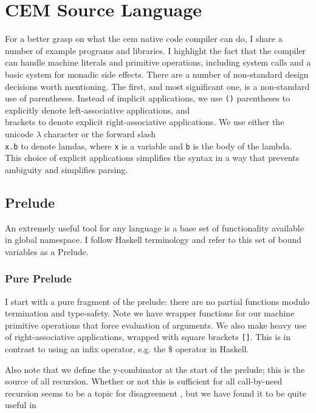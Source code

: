 \chapter{CEM Source Language}

For a better grasp on what the cem native code compiler can do, I share a
number of example programs and libraries. I highlight the fact that the compiler
can handle machine literals and primitive operations, including system calls and
a basic system for monadic side effects.  There are a number of non-standard
design decisions worth mentioning. The first, and most significant one, is a
non-standard use of parentheses. Instead of implicit applications, we use
\texttt{()} parentheses to explicitly denote left-associative applications, and
\texttt{\[\]} brackets to denote explicit right-associative applications. We use
either the unicode $\lambda$ character or the forward slash \texttt{\\x.b} to
denote lamdas, where \texttt{x} is a variable and \texttt{b} is the body of the
lambda. This choice of explicit applications simplifies the syntax in a way that
prevents ambiguity and simplifies parsing. 

\section{Prelude}
An extremely useful tool for any language is a base set of functionality
available in global namespace. I follow Haskell terminology and refer to this
set of bound variables as a Prelude. 

\subsection{Pure Prelude}
I start with a pure fragment of the prelude: there are no partial functions
modulo termination and type-safety. Note we have wrapper functions for our
machine primitive operations that force evaluation of arguments. We also make
heavy use of right-associative applications, wrapped with square brackets
\texttt{[]}. This is in contrast to using an infix operator, e.g. the $\$$
operator in Haskell.

Also note that we define the y-combinator at the start of the prelude; this is
the source of all recursion. Whether or not this is sufficient for all
call-by-need recursion seems to be a topic for disagreement \cite{ariola}, but
we have found it to be quite useful in     

